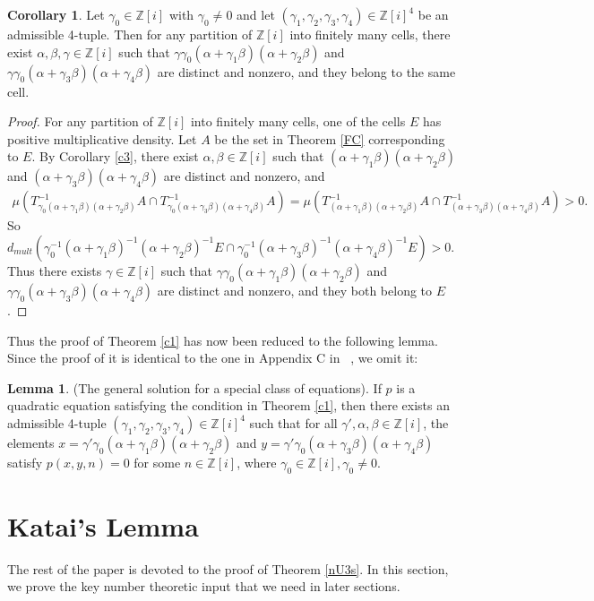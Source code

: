 \documentclass[12pt,amstex]{amsart}
\theoremstyle{definition}
\newtheorem{lem}[thm]{Lemma}
\newtheorem{cor}[thm]{Corollary}
\def \Z {\mathbb{Z}[i]}
\def \A {\alpha}
\def \B {\beta}
\def \C {\gamma}
\begin{document}
\begin{cor}\label{c2}
  Let $\C_{0}\in\Z$ with $\C_{0}\neq 0$ and let $(\C_{1},\C_{2},\C_{3},\C_{4})\in\Z^{4}$ be an admissible 4-tuple. Then for any partition of $\Z$ into finitely many cells, there exist $\A,\B,\C\in\Z$ such that $\C\C_{0}(\A+\C_{1}\B)(\A+\C_{2}\B)$ and $\C\C_{0}(\A+\C_{3}\B)(\A+\C_{4}\B)$ are distinct and nonzero, and they belong to the same cell.
\end{cor}
\begin{proof} For any partition of $\Z$ into finitely many cells, one of the cells $E$ has positive multiplicative density. Let $A$ be the set in Theorem \ref{FC} corresponding to $E$.
By Corollary \ref{c3},
there exist $\A,\B\in\Z$ such that $(\A+\C_{1}\B)(\A+\C_{2}\B)$ and $(\A+\C_{3}\B)(\A+\C_{4}\B)$ are distinct and nonzero, and
\begin{equation}\nonumber
  \begin{split}
    \mu(T_{\C_{0}(\A+\C_{1}\B)(\A+\C_{2}\B)}^{-1}A\cap T_{\C_{0}(\A+\C_{3}\B)(\A+\C_{4}\B)}^{-1}A)=\mu(T_{(\A+\C_{1}\B)(\A+\C_{2}\B)}^{-1}A\cap T_{(\A+\C_{3}\B)(\A+\C_{4}\B)}^{-1}A)>0.
  \end{split}
  \end{equation}
  So $d_{mult}(\C_{0}^{-1}(\A+\C_{1}\B)^{-1}(\A+\C_{2}\B)^{-1}E\cap\C_{0}^{-1}(\A+\C_{3}\B)^{-1}(\A+\C_{4}\B)^{-1}E)>0$. Thus there exists $\C\in\Z$ such that
  $\C\C_{0}(\A+\C_{1}\B)(\A+\C_{2}\B)$ and $\C\C_{0}(\A+\C_{3}\B)(\A+\C_{4}\B)$ are distinct and nonzero, and they both belong to $E$.
\end{proof}

Thus the proof of Theorem \ref{c1} has now been reduced to the following lemma. Since the proof of it is identical to the one in Appendix C in ~\cite{FH}, we omit it:

\begin{lem}\label{ge}(The general solution for a special class of equations).
  If $p$ is a quadratic equation satisfying the condition in Theorem \ref{c1}, then there exists an admissible 4-tuple $(\C_{1},\C_{2},\C_{3},\C_{4})\in\Z^{4}$ such that for all $\C',\A,\B\in\Z$, the elements $x=\C'\C_{0}(\A+\C_{1}\B)(\A+\C_{2}\B)$ and $y=\C'\C_{0}(\A+\C_{3}\B)(\A+\C_{4}\B)$
  satisfy $p(x,y,n)=0$ for some $n\in\Z$, where $\C_{0}\in\Z,\C_{0}\neq 0$.
\end{lem}



\section{Katai's Lemma}
The rest of the paper is devoted to the proof of Theorem \ref{nU3s}. In this section, we prove the key number theoretic input
that we need in later sections.
\end{document}
